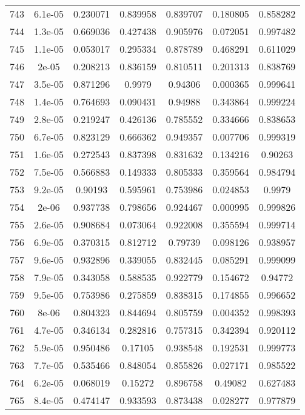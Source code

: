 \begin{table}
\begin{tabular}{c|c|c|c|c|c|c}
743 & 6.1e-05 & 0.230071 & 0.839958 & 0.839707 & 0.180805 & 0.858282\\
744 & 1.3e-05 & 0.669036 & 0.427438 & 0.905976 & 0.072051 & 0.997482\\
745 & 1.1e-05 & 0.053017 & 0.295334 & 0.878789 & 0.468291 & 0.611029\\
746 & 2e-05 & 0.208213 & 0.836159 & 0.810511 & 0.201313 & 0.838769\\
747 & 3.5e-05 & 0.871296 & 0.9979 & 0.94306 & 0.000365 & 0.999641\\
748 & 1.4e-05 & 0.764693 & 0.090431 & 0.94988 & 0.343864 & 0.999224\\
749 & 2.8e-05 & 0.219247 & 0.426136 & 0.785552 & 0.334666 & 0.838653\\
750 & 6.7e-05 & 0.823129 & 0.666362 & 0.949357 & 0.007706 & 0.999319\\
751 & 1.6e-05 & 0.272543 & 0.837398 & 0.831632 & 0.134216 & 0.90263\\
752 & 7.5e-05 & 0.566883 & 0.149333 & 0.805333 & 0.359564 & 0.984794\\
753 & 9.2e-05 & 0.90193 & 0.595961 & 0.753986 & 0.024853 & 0.9979\\
754 & 2e-06 & 0.937738 & 0.798656 & 0.924467 & 0.000995 & 0.999826\\
755 & 2.6e-05 & 0.908684 & 0.073064 & 0.922008 & 0.355594 & 0.999714\\
756 & 6.9e-05 & 0.370315 & 0.812712 & 0.79739 & 0.098126 & 0.938957\\
757 & 9.6e-05 & 0.932896 & 0.339055 & 0.832445 & 0.085291 & 0.999099\\
758 & 7.9e-05 & 0.343058 & 0.588535 & 0.922779 & 0.154672 & 0.94772\\
759 & 9.5e-05 & 0.753986 & 0.275859 & 0.838315 & 0.174855 & 0.996652\\
760 & 8e-06 & 0.804323 & 0.844694 & 0.805759 & 0.004352 & 0.998393\\
761 & 4.7e-05 & 0.346134 & 0.282816 & 0.757315 & 0.342394 & 0.920112\\
762 & 5.9e-05 & 0.950486 & 0.17105 & 0.938548 & 0.192531 & 0.999773\\
763 & 7.7e-05 & 0.535466 & 0.848054 & 0.855826 & 0.027171 & 0.985522\\
764 & 6.2e-05 & 0.068019 & 0.15272 & 0.896758 & 0.49082 & 0.627483\\
765 & 8.4e-05 & 0.474147 & 0.933593 & 0.873438 & 0.028277 & 0.977879\\
\end{tabular}
\end{table}
